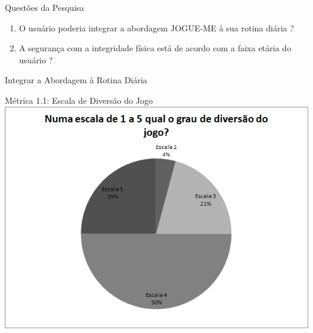 \documentclass{beamer}
\begin{document}
\begin{frame}{Questões da Pesquisa} 
    \begin{block}{}
			\begin{enumerate}
				\item O usuário poderia integrar a abordagem JOGUE-ME à sua rotina diária ?
				\item A segurança com a integridade física está de acordo com a faixa etária do usuário ?
			\end{enumerate}
    \end{block}
\end{frame}


% 



\begin{frame}{Integrar a Abordagem à Rotina Diária} 
    \begin{block}{Métrica 1.1: Escala de Diversão do Jogo}
			\center \includegraphics[height=2.6 in]{img/chart_1-.png}
    \end{block}
\end{frame}
\end{document}
